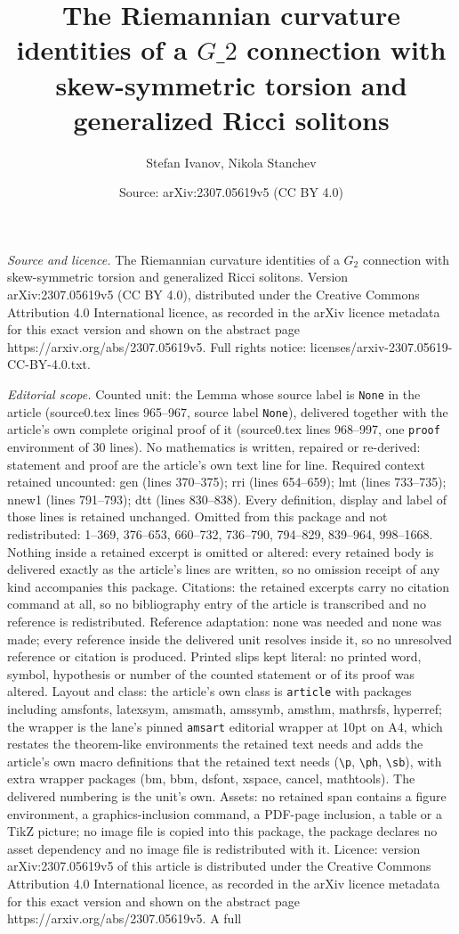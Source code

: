 \documentclass[10pt,a4paper]{amsart}
\title[The Riemannian curvature identities of a $G\_2$ connection wi]{The Riemannian curvature identities of a $G\_2$ connection with skew-symmetric torsion and generalized Ricci solitons}
\author{Stefan Ivanov, Nikola Stanchev}
\date{Source: arXiv:2307.05619v5 (CC BY 4.0)}
\begin{document}
\maketitle

\noindent\emph{Source and licence.} The Riemannian curvature identities of a $G_2$ connection with skew-symmetric torsion and generalized Ricci solitons. Version arXiv:2307.05619v5 (CC BY 4.0), distributed under the Creative Commons Attribution 4.0 International licence, as recorded in the arXiv licence metadata for this exact version and shown on the abstract page https://arxiv.org/abs/2307.05619v5. Full rights notice: licenses/arxiv-2307.05619-CC-BY-4.0.txt.\par\smallskip

\noindent\textit{Editorial scope.} Counted unit: the Lemma whose source label is \texttt{None} in the article (source0.tex lines 965--967, source label \texttt{None}), delivered together with the article's own complete original proof of it (source0.tex lines 968--997, one \texttt{proof} environment of 30 lines). No mathematics is written, repaired or re-derived: statement and proof are the article's own text line for line. Required context retained uncounted: gen (lines 370--375); rri (lines 654--659); lmt (lines 733--735); nnew1 (lines 791--793); dtt (lines 830--838). Every definition, display and label of those lines is retained unchanged. Omitted from this package and not redistributed: 1--369, 376--653, 660--732, 736--790, 794--829, 839--964, 998--1668. Nothing inside a retained excerpt is omitted or altered: every retained body is delivered exactly as the article's lines are written, so no omission receipt of any kind accompanies this package. Citations: the retained excerpts carry no citation command at all, so no bibliography entry of the article is transcribed and no reference is redistributed. Reference adaptation: none was needed and none was made; every reference inside the delivered unit resolves inside it, so no unresolved reference or citation is produced. Printed slips kept literal: no printed word, symbol, hypothesis or number of the counted statement or of its proof was altered. Layout and class: the article's own class is \texttt{article} with packages including amsfonts, latexsym, amsmath, amssymb, amsthm, mathrsfs, hyperref; the wrapper is the lane's pinned \texttt{amsart} editorial wrapper at 10pt on A4, which restates the theorem-like environments the retained text needs and adds the article's own macro definitions that the retained text needs (\texttt{\textbackslash p}, \texttt{\textbackslash ph}, \texttt{\textbackslash sb}), with extra wrapper packages (bm, bbm, dsfont, xspace, cancel, mathtools). The delivered numbering is the unit's own. Assets: no retained span contains a figure environment, a graphics-inclusion command, a PDF-page inclusion, a table or a TikZ picture; no image file is copied into this package, the package declares no asset dependency and no image file is redistributed with it. Licence: version arXiv:2307.05619v5 of this article is distributed under the Creative Commons Attribution 4.0 International licence, as recorded in the arXiv licence metadata for this exact version and shown on the abstract page https://arxiv.org/abs/2307.05619v5. A full 
\end{document}
